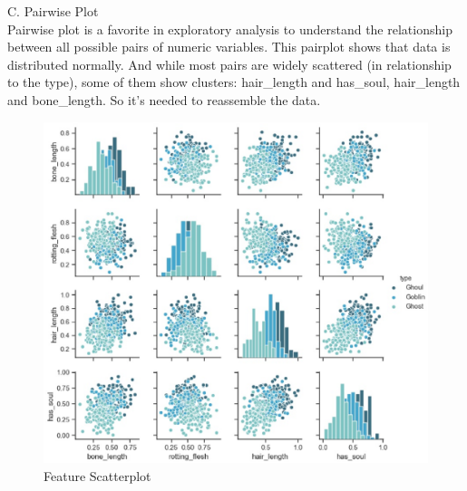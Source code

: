 \hspace*{0.4cm}C. Pairwise Plot\\
\hspace*{0.4cm}Pairwise plot is a favorite in exploratory analysis to understand the relationship between all possible pairs of numeric variables. This pairplot shows that data is distributed normally. And while most pairs are widely scattered (in relationship to the type), some of them show clusters: hair_length and has_soul, hair_length and bone_length. So it's needed to reassemble the data.\\%
\begin{figure}[h]\centering
	\includegraphics[scale=0.3]{5.eps}
	\caption{Feature Scatterplot}
\end{figure}


